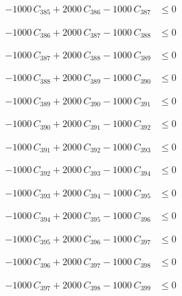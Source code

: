 \documentclass[a4paper,11pt]{article}
\begin{document}
\begin{align}
-1000\,C_{385} + 2000\,C_{386} - 1000\,C_{387} &\leq 0 \nonumber
\end{align}

\begin{align}
-1000\,C_{386} + 2000\,C_{387} - 1000\,C_{388} &\leq 0 \nonumber
\end{align}

\begin{align}
-1000\,C_{387} + 2000\,C_{388} - 1000\,C_{389} &\leq 0 \nonumber
\end{align}

\begin{align}
-1000\,C_{388} + 2000\,C_{389} - 1000\,C_{390} &\leq 0 \nonumber
\end{align}

\begin{align}
-1000\,C_{389} + 2000\,C_{390} - 1000\,C_{391} &\leq 0 \nonumber
\end{align}

\begin{align}
-1000\,C_{390} + 2000\,C_{391} - 1000\,C_{392} &\leq 0 \nonumber
\end{align}

\begin{align}
-1000\,C_{391} + 2000\,C_{392} - 1000\,C_{393} &\leq 0 \nonumber
\end{align}

\begin{align}
-1000\,C_{392} + 2000\,C_{393} - 1000\,C_{394} &\leq 0 \nonumber
\end{align}

\begin{align}
-1000\,C_{393} + 2000\,C_{394} - 1000\,C_{395} &\leq 0 \nonumber
\end{align}

\begin{align}
-1000\,C_{394} + 2000\,C_{395} - 1000\,C_{396} &\leq 0 \nonumber
\end{align}

\begin{align}
-1000\,C_{395} + 2000\,C_{396} - 1000\,C_{397} &\leq 0 \nonumber
\end{align}

\begin{align}
-1000\,C_{396} + 2000\,C_{397} - 1000\,C_{398} &\leq 0 \nonumber
\end{align}

\begin{align}
-1000\,C_{397} + 2000\,C_{398} - 1000\,C_{399} &\leq 0 \nonumber
\end{align}
\end{document}
